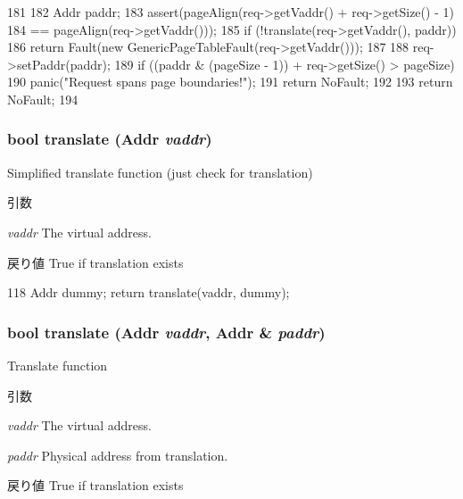 \begin{DoxyCode}
181 {
182     Addr paddr;
183     assert(pageAlign(req->getVaddr() + req->getSize() - 1)
184            == pageAlign(req->getVaddr()));
185     if (!translate(req->getVaddr(), paddr)) {
186         return Fault(new GenericPageTableFault(req->getVaddr()));
187     }
188     req->setPaddr(paddr);
189     if ((paddr & (pageSize - 1)) + req->getSize() > pageSize) {
190         panic("Request spans page boundaries!\n");
191         return NoFault;
192     }
193     return NoFault;
194 }
\end{DoxyCode}
\hypertarget{classPageTable_a72077eb2c400826c0a18b845a7be0e6a}{
\subsubsection[{translate}]{\setlength{\rightskip}{0pt plus 5cm}bool translate ({\bf Addr} {\em vaddr})}}
\label{classPageTable_a72077eb2c400826c0a18b845a7be0e6a}
Simplified translate function (just check for translation) 
\begin{DoxyParams}{引数}
\item[{\em vaddr}]The virtual address. \end{DoxyParams}
\begin{DoxyReturn}{戻り値}
True if translation exists 
\end{DoxyReturn}



\begin{DoxyCode}
118 { Addr dummy; return translate(vaddr, dummy); }
\end{DoxyCode}
\hypertarget{classPageTable_a1fa58423b982a3454aadc9b5e932e9ed}{
\subsubsection[{translate}]{\setlength{\rightskip}{0pt plus 5cm}bool translate ({\bf Addr} {\em vaddr}, \/  {\bf Addr} \& {\em paddr})}}
\label{classPageTable_a1fa58423b982a3454aadc9b5e932e9ed}
Translate function 
\begin{DoxyParams}{引数}
\item[{\em vaddr}]The virtual address. \item[{\em paddr}]Physical address from translation. \end{DoxyParams}
\begin{DoxyReturn}{戻り値}
True if translation exists 
\end{DoxyReturn}




